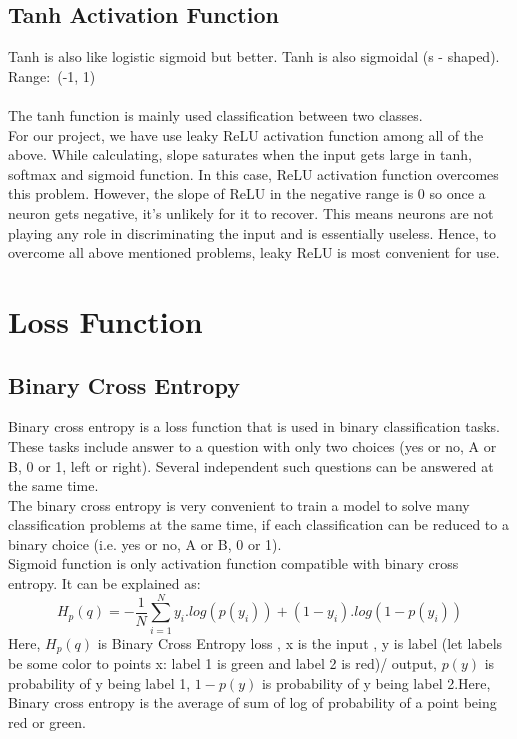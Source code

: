         \subsection{Tanh Activation Function}
        Tanh is also like logistic sigmoid but better. Tanh is also sigmoidal (s - shaped).\\
        Range: (-1, 1)\\\\
        The tanh function is mainly used classification between two classes.\\
     
    \noindent For our project, we have use leaky ReLU activation function among all of the above.
    While calculating, slope saturates when the input gets large in tanh, softmax and sigmoid function. In this case,
    ReLU activation function overcomes this problem. However, the slope of ReLU in the negative range is 0 so once a neuron gets negative, it’s unlikely for it to recover.
    This means neurons are not playing any role in discriminating the input and is essentially useless. Hence, to overcome all above
    mentioned problems, leaky ReLU is most convenient for use.
        
           
    \section{Loss Function}
        \subsection{Binary Cross Entropy}
            Binary cross entropy is a loss function that is used in binary classification tasks. These  tasks include answer to a  question with only two choices (yes or no, A or B, 0 or 1, left or right). Several independent such questions can be answered at the same time.\\
            The binary cross entropy is very convenient to train a model to solve many classification problems at the same time, if each classification can be reduced to a binary choice (i.e. yes or no, A or B, 0 or 1).\\
            Sigmoid function is only activation function compatible with  binary cross entropy.
            It can be explained as:
            \begin{equation}
                H_p(q) = -\frac{1}{N}\sum^N_{i=1}y_i.log(p(y_i)) + (1-y_i).log(1-p(y_i))
            \end{equation}
            Here, ${H_p(q)}$ is Binary Cross Entropy loss , x is the input , y is label (let labels be some color to points x:  label 1 is green and label 2 is red)/ output, ${p(y)}$ is probability of y being label 1, ${1-p(y)}$ is probability of y being label 2.Here, Binary cross entropy is the average of sum of log of probability of a point being red or green.
